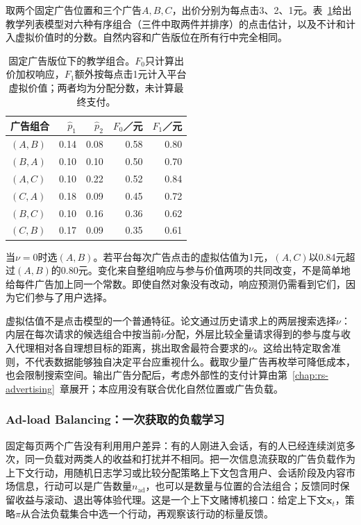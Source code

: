 取两个固定广告位置和三个广告$A,B,C$，出价分别为每点击3、2、1元。表~\ref{tab:rs-virtual-bids-example}给出教学列表模型对六种有序组合（三件中取两件并排序）的点击估计，以及不计和计入虚拟价值时的分数。自然内容和广告版位在所有行中完全相同。

\begin{table}[htbp]
 \centering\small
 \begin{tabular}{@{}lrrrr@{}}
  \toprule
  广告组合 & $\widehat p_1$ & $\widehat p_2$ & $F_0$／元 & $F_1$／元\\
  \midrule
  $(A,B)$ & 0.14 & 0.08 & 0.58 & 0.80\\
  $(B,A)$ & 0.10 & 0.10 & 0.50 & 0.70\\
  $(A,C)$ & 0.10 & 0.22 & 0.52 & 0.84\\
  $(C,A)$ & 0.18 & 0.09 & 0.45 & 0.72\\
  $(B,C)$ & 0.10 & 0.16 & 0.36 & 0.62\\
  $(C,B)$ & 0.17 & 0.09 & 0.35 & 0.61\\
  \bottomrule
 \end{tabular}
 \caption{固定广告版位下的教学组合。$F_0$只计算出价加权响应，$F_1$额外按每点击1元计入平台虚拟价值；两者均为分配分数，未计算最终支付。}
 \label{tab:rs-virtual-bids-example}
\end{table}

当$\nu=0$时选$(A,B)$。若平台每次广告点击的虚拟估值为1元，$(A,C)$以0.84元超过$(A,B)$的0.80元。变化来自整组响应与参与价值两项的共同改变，不是简单地给每件广告加上同一个常数。即使自然对象没有改动，响应预测仍需看到它们，因为它们参与了用户选择。

虚拟估值不是点击模型的一个普通特征。论文通过历史请求上的两层搜索选择$\nu$：内层在每次请求的候选组合中按当前$\nu$分配，外层比较全量请求得到的参与度与收入代理相对各自理想目标的距离，挑出取舍最符合要求的$\nu$。这给出特定取舍准则，不代表数据能够独自决定平台应重视什么。截取少量广告再枚举可降低成本，也会限制搜索空间。输出广告分配后，考虑外部性的支付计算由第~\ref{chap:rs-advertising}~章展开；本应用没有联合优化自然位置或广告负载。

\subsubsection{Ad-load Balancing：一次获取的负载学习}
\label{sec:rs-ad-load}

固定每页两个广告没有利用用户差异：有的人刚进入会话，有的人已经连续浏览多次，同一负载对两类人的收益和打扰并不相同。把一次信息流获取的广告负载作为上下文行动，用随机日志学习或比较分配策略上下文包含用户、会话阶段及内容市场信息，行动可以是广告数量$n_{\mathrm{ad}}$，也可以是数量与位置的合法组合；反馈同时保留收益与滚动、退出等体验代理。这是一个上下文赌博机接口：给定上下文$\bm x_t$，策略$\pi$从合法负载集合中选一个行动，再观察该行动的标量反馈。

